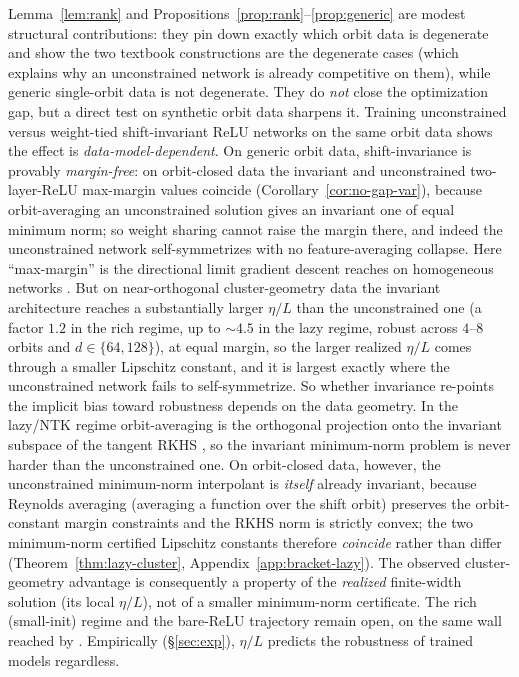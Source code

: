 \documentclass{article}
\theoremstyle{definition}
\begin{document}
Lemma~\ref{lem:rank} and Propositions~\ref{prop:rank}--\ref{prop:generic} are modest structural contributions: they pin down exactly which orbit data is degenerate and show the two textbook constructions are the degenerate cases (which explains why an unconstrained network is already competitive on them), while generic single-orbit data is not degenerate. They do \emph{not} close the optimization gap, but a direct test on synthetic orbit data sharpens it. Training unconstrained versus weight-tied shift-invariant ReLU networks on the same orbit data shows the effect is \emph{data-model-dependent}. On generic orbit data, shift-invariance is provably \emph{margin-free}: on orbit-closed data the invariant and unconstrained two-layer-ReLU max-margin values coincide (Corollary~\ref{cor:no-gap-var}), because orbit-averaging an unconstrained solution gives an invariant one of equal minimum norm; so weight sharing cannot raise the margin there, and indeed the unconstrained network self-symmetrizes with no feature-averaging collapse. Here ``max-margin'' is the directional limit gradient descent reaches on homogeneous networks \citep{soudry2018implicit,lyu2020gradient,ji2020directional}. But on near-orthogonal cluster-geometry data the invariant architecture reaches a substantially larger $\eta/L$ than the unconstrained one (a factor $1.2$ in the rich regime, up to $\sim$$4.5$ in the lazy regime, robust across $4$--$8$ orbits and $d\in\{64,128\}$), at equal margin, so the larger realized $\eta/L$ comes through a smaller Lipschitz constant, and it is largest exactly where the unconstrained network fails to self-symmetrize. So whether invariance re-points the implicit bias toward robustness depends on the data geometry. In the lazy/NTK regime orbit-averaging is the orthogonal projection onto the invariant subspace of the tangent RKHS \citep{elesedy2021provably}, so the invariant minimum-norm problem is never harder than the unconstrained one. On orbit-closed data, however, the unconstrained minimum-norm interpolant is \emph{itself} already invariant, because Reynolds averaging (averaging a function over the shift orbit) preserves the orbit-constant margin constraints and the RKHS norm is strictly convex; the two minimum-norm certified Lipschitz constants therefore \emph{coincide} rather than differ (Theorem~\ref{thm:lazy-cluster}, Appendix~\ref{app:bracket-lazy}). The observed cluster-geometry advantage is consequently a property of the \emph{realized} finite-width solution (its local $\eta/L$), not of a smaller minimum-norm certificate. The rich (small-init) regime and the bare-ReLU trajectory remain open, on the same wall reached by \citet{frei2023double,min2024can,li2025feature}. Empirically (\S\ref{sec:exp}), $\eta/L$ predicts the robustness of trained models regardless.
\end{document}
